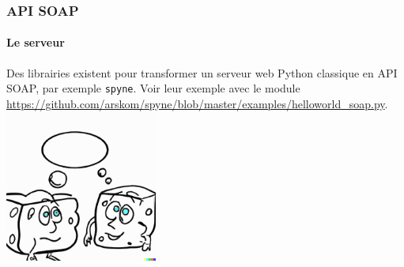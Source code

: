 \documentclass{beamer}
\begin{document}
    \begin{frame}
        \transdissolve
        \frametitle{API SOAP}
        \framesubtitle{Le serveur}
        Des librairies existent pour transformer un serveur web Python classique en API SOAP, par exemple \lstinline{spyne}.
        Voir leur exemple avec le module \url{https://github.com/arskom/spyne/blob/master/examples/helloworld_soap.py}.
        \bigbreak
        \centering
        \includegraphics[width=5cm]{image/soaps-chatting}
    \end{frame}
\end{document}
